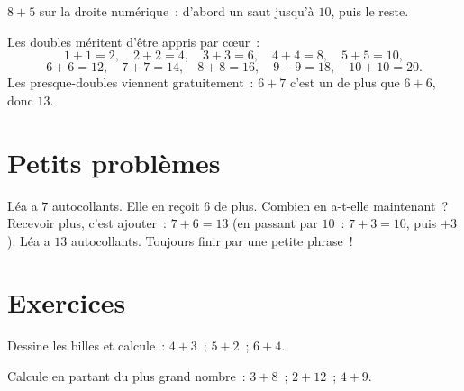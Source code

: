 \begin{omfigure}

{\small $8 + 5$ sur la droite numérique~: d'abord un saut jusqu'à
$10$, puis le reste.}
\end{omfigure}

\begin{example}\label{ex:g1:addition:doubles}
Les doubles méritent d'être appris par cœur~:
\[
1+1=2, \quad 2+2=4, \quad 3+3=6, \quad 4+4=8, \quad 5+5=10,
\]
\[
6+6=12, \quad 7+7=14, \quad 8+8=16, \quad 9+9=18, \quad 10+10=20 .
\]
Les presque-doubles viennent gratuitement~: $6 + 7$ c'est un de plus
que $6 + 6$, donc $13$.
\end{example}

\section{Petits problèmes}

\begin{example}\label{ex:g1:addition:problem}
\guillemotleft{} Léa a $7$ autocollants. Elle en reçoit $6$ de
plus. Combien en a-t-elle maintenant~? \guillemotright{} Recevoir
plus, c'est ajouter~: $7 + 6 = 13$ (en passant par $10$~:
$7 + 3 = 10$, puis $+3$). Léa a $13$ autocollants. Toujours finir
par une petite phrase~!
\end{example}

\section{Exercices}

\begin{exercise}[$\star$]\label{exo:g1:addition:1}
Dessine les billes et calcule~: $4 + 3$~; \quad $5 + 2$~; \quad
$6 + 4$.
\end{exercise}

\begin{exercise}[$\star$]\label{exo:g1:addition:2}
Calcule en partant du plus grand nombre~: $3 + 8$~; \quad
$2 + 12$~; \quad $4 + 9$.
\end{exercise}


